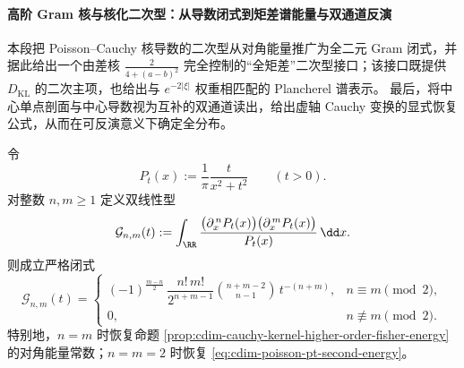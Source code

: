 \paragraph{高阶 Gram 核与核化二次型：从导数闭式到矩差谱能量与双通道反演}
本段把 Poisson--Cauchy 核导数的二次型从对角能量推广为全二元 Gram 闭式，并据此给出一个由差核 \(\frac{2}{4+(a-b)^2}\) 完全控制的“全矩差”二次型接口；该接口既提供 \(D_{\mathrm{KL}}\) 的二次主项，也给出与 \(e^{-2|\xi|}\) 权重相匹配的 Plancherel 谱表示。
最后，将中心单点剖面与中心导数视为互补的双通道读出，给出虚轴 Cauchy 变换的显式恢复公式，从而在可反演意义下确定全分布。

\begin{proposition}\label{prop:cdim-cauchy-kernel-derivative-gram-closed-form}
令
\[
P_t(x):=\frac{1}{\pi}\frac{t}{x^2+t^2}\qquad(t>0).
\]
对整数 \(n,m\ge 1\) 定义双线性型
\[
\mathcal G_{n,m}(t)
:=\int_{\RR}\frac{\bigl(\partial_x^{\,n}P_t(x)\bigr)\bigl(\partial_x^{\,m}P_t(x)\bigr)}{P_t(x)}\,\dd x.
\]
则成立严格闭式
\[
\boxed{\;
\mathcal G_{n,m}(t)=
\begin{cases}
(-1)^{\frac{m-n}{2}}\,
\dfrac{n!\,m!}{2^{n+m-1}}\binom{n+m-2}{n-1}\,t^{-(n+m)}, & n\equiv m\pmod 2,\\[6pt]
0, & n\not\equiv m\pmod 2.
\end{cases}
\;}
\]
特别地，\(n=m\) 时恢复命题 \ref{prop:cdim-cauchy-kernel-higher-order-fisher-energy} 的对角能量常数；\(n=m=2\) 时恢复 \eqref{eq:cdim-poisson-pt-second-energy}。
\end{proposition}

